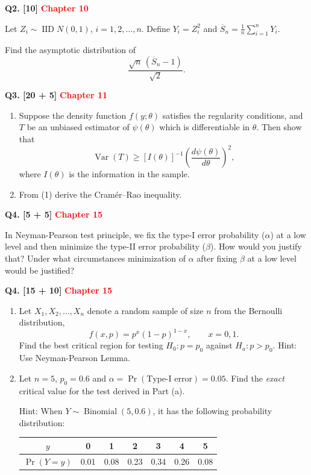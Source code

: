 \documentclass[11pt]{article}
\begin{document}
\bigskip

\textbf{Q2. [10]} \textbf{\textcolor{red}{Chapter 10}}

Let $Z_i\sim\operatorname{IID}N(0,1)$, $i=1,2,\ldots,n$. Define $Y_i=Z_i^2$ and $\overline S_n=\frac1n\sum_{i=1}^n Y_i$.

Find the asymptotic distribution of
\[
\frac{\sqrt n\,(\overline S_n-1)}{\sqrt 2}.
\]

\bigskip

\textbf{Q3. [20 + 5]} \textbf{\textcolor{red}{Chapter 11}}

\begin{enumerate}
\item[(a)] Suppose the density function $f(y;\theta)$ satisfies the regularity conditions, and $T$ be an unbiased estimator of $\psi(\theta)$ which is differentiable in $\theta$. Then show that
\[
\operatorname{Var}(T)\geq [I(\theta)]^{-1}
\left(\frac{d\psi(\theta)}{d\theta}\right)^2, \tag{1}
\]
where $I(\theta)$ is the information in the sample.

\item[(b)] From (1) derive the Cram\'er--Rao inequality.
\end{enumerate}

\bigskip

\textbf{Q4. [5 + 5]} \textbf{\textcolor{red}{Chapter 15}}

In Neyman-Pearson test principle, we fix the type-I error probability ($\alpha$) at a low level and then minimize the type-II error probability ($\beta$). How would you justify that? Under what circumstances minimization of $\alpha$ after fixing $\beta$ at a low level would be justified?

\bigskip

\newpage
\textbf{Q4. [15 + 10]} \textbf{\textcolor{red}{Chapter 15}}

\begin{enumerate}
\item[(a)] Let $X_1,X_2,\ldots,X_n$ denote a random sample of size $n$ from the Bernoulli distribution,
\[
f(x,p)=p^x(1-p)^{1-x},\qquad x=0,1.
\]
Find the best critical region for testing $H_0:p=p_0$ against $H_a:p>p_0$. Hint: Use Neyman-Pearson Lemma.

\item[(b)] Let $n=5$, $p_0=0.6$ and $\alpha=\Pr(\text{Type-I error})=0.05$. Find the \emph{exact} critical value for the test derived in Part (a).

Hint: When $Y\sim\operatorname{Binomial}(5,0.6)$, it has the following probability distribution:
\begin{center}
\begin{tabular}{c|cccccc}
$y$ & 0 & 1 & 2 & 3 & 4 & 5 \\ \hline
$\Pr(Y=y)$ & 0.01 & 0.08 & 0.23 & 0.34 & 0.26 & 0.08
\end{tabular}
\end{center}
\end{enumerate}
\end{document}
